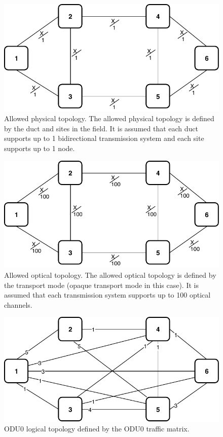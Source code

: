 \newpage
\vspace{20pt}
\begin{figure}[h!]
\centering
\includegraphics[width=13cm]{sdf/ilp/opaque_survivability/figures/allowed_physical_topology}
\caption{Allowed physical topology. The allowed physical topology is defined by the duct and sites in the field. It is assumed that each duct supports up to 1 bidirectional transmission system and each site supports up to 1 node.}
\label{allowed_physical_low}
\end{figure}

\vspace{20pt}
\begin{figure}[h!]
\centering
\includegraphics[width=13cm]{sdf/ilp/opaque_survivability/figures/allowed_optical_topology}
\caption{Allowed optical topology. The allowed optical topology is defined by the transport mode (opaque transport mode in this case). It is assumed that each transmission system supports up to 100 optical channels.}
\label{allowed_optical_low}
\end{figure}

\newpage
\begin{figure}[h!]
\centering
\includegraphics[width=12cm]{sdf/ilp/opaque_survivability/figures/logical_topology_ODU0_low}
\caption{ODU0 logical topology defined by the ODU0 traffic matrix.}
\label{logical_ODU0_low}
\end{figure}


